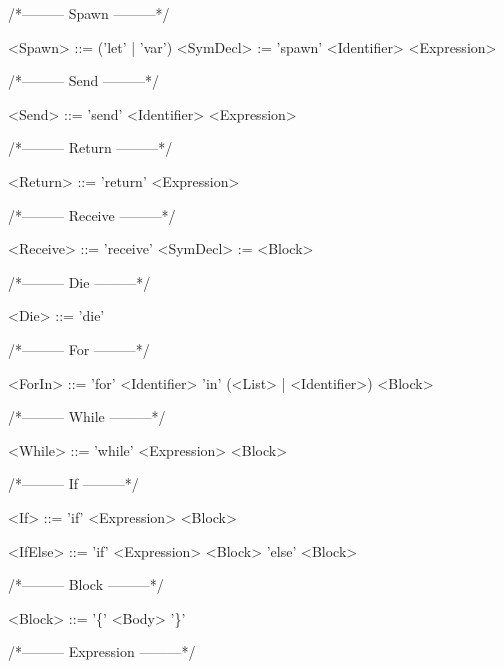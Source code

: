 /*--------- Spawn ---------*/
\begin{grammar}
<Spawn> ::= ('let' | 'var') <SymDecl> := 'spawn' <Identifier> <Expression>

\end{grammar}
/*--------- Send ---------*/
\begin{grammar}
<Send> ::= 'send' <Identifier> <Expression>

\end{grammar}
/*--------- Return ---------*/
\begin{grammar}
<Return> ::= 'return' <Expression>

\end{grammar}
/*--------- Receive ---------*/
\begin{grammar}
<Receive> ::= 'receive' <SymDecl> := <Block>

\end{grammar}
/*--------- Die ---------*/
\begin{grammar}
<Die> ::= 'die'

\end{grammar}
/*--------- For ---------*/
\begin{grammar}
<ForIn> ::= 'for' <Identifier> 'in' (<List> | <Identifier>) <Block>

\end{grammar}
/*--------- While ---------*/
\begin{grammar}
<While> ::= 'while' <Expression> <Block>

\end{grammar}
/*--------- If ---------*/
\begin{grammar}
<If> ::= 'if' <Expression> <Block>

<IfElse> ::= 'if' <Expression> <Block> 'else' <Block>

\end{grammar}
/*--------- Block ---------*/
\begin{grammar}
<Block> ::= '\{' <Body> '\}'

\end{grammar}
/*--------- Expression ---------*/
